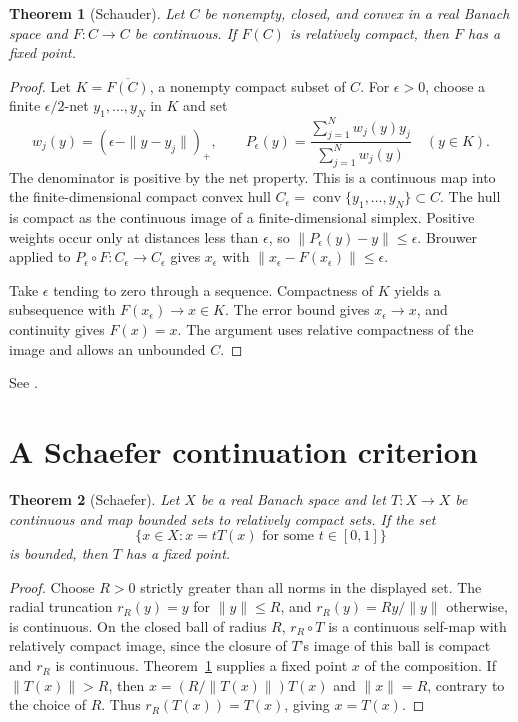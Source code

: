 \documentclass[11pt,oneside,openany]{book}
\theoremstyle{plain}
\newtheorem{theorem}{Theorem}[chapter]
\theoremstyle{definition}
\theoremstyle{remark}
\begin{document}
\begin{theorem}[Schauder]
\label{thm:schauder-fixed-point}
Let \(C\) be nonempty, closed, and convex in a real Banach space
and \(F:C\to C\) be continuous. If \(F(C)\) is relatively compact,
then \(F\) has a fixed point.
\end{theorem}
\begin{proof}
Let \(K=\overline{F(C)}\), a nonempty compact subset of \(C\).
For \(\epsilon>0\), choose a finite \(\epsilon/2\)-net
\(y_1,\ldots,y_N\) in \(K\) and set
\[
 w_j(y)=(\epsilon-\|y-y_j\|)_+,\qquad
 P_\epsilon(y)=\frac{\sum_{j=1}^{N}w_j(y)y_j}
                     {\sum_{j=1}^{N}w_j(y)}\quad(y\in K).
\]
The denominator is positive by the net property.
This is a continuous map into the finite-dimensional compact
convex hull \(C_\epsilon=\operatorname{conv}\{y_1,\ldots,y_N\}
\subset C\). The hull is compact as the continuous image
of a finite-dimensional simplex. Positive weights occur
only at distances less than \(\epsilon\), so
\(\|P_\epsilon(y)-y\|\le\epsilon\).
Brouwer applied to \(P_\epsilon\circ F:C_\epsilon\to C_\epsilon\)
gives \(x_\epsilon\) with
\(\|x_\epsilon-F(x_\epsilon)\|\le\epsilon\).

Take \(\epsilon\) tending to zero through a sequence.
Compactness of \(K\) yields a subsequence with
\(F(x_\epsilon)\to x\in K\). The error bound gives
\(x_\epsilon\to x\), and continuity gives \(F(x)=x\).
The argument uses relative compactness of the image and
allows an unbounded \(C\).
\end{proof}

See \cite[Exercise 6.26]{Brezis}.

\section{A Schaefer continuation criterion}
\label{v10-03}

\begin{theorem}[Schaefer]
\label{thm:v10-03-01}
Let \(X\) be a real Banach space and let \(T:X\to X\) be
continuous and map bounded sets to relatively compact sets.
If the set
\[
 \{x\in X:x=tT(x)\text{ for some }t\in[0,1]\}
\]
is bounded, then \(T\) has a fixed point.
\end{theorem}
\begin{proof}
Choose \(R>0\) strictly greater than all norms in the
displayed set. The radial truncation \(r_R(y)=y\) for
\(\|y\|\le R\), and \(r_R(y)=Ry/\|y\|\) otherwise, is
continuous. On the closed ball of radius \(R\),
\(r_R\circ T\) is a continuous self-map with relatively
compact image, since the closure of \(T\)'s image of
this ball is compact and \(r_R\) is continuous.
Theorem~\ref{thm:schauder-fixed-point} supplies a fixed
point \(x\) of the composition.
If \(\|T(x)\|>R\), then \(x=(R/\|T(x)\|)T(x)\) and
\(\|x\|=R\), contrary to the choice of \(R\).
Thus \(r_R(T(x))=T(x)\), giving \(x=T(x)\).
\end{proof}
\end{document}

